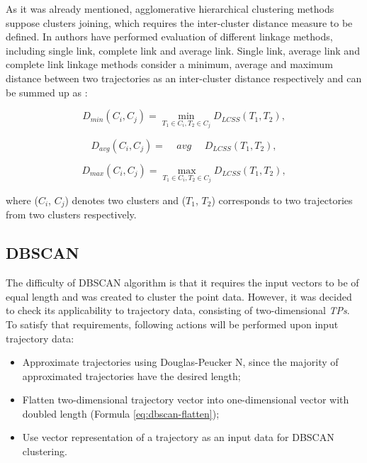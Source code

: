 As it was already mentioned, agglomerative hierarchical clustering methods suppose clusters joining, which requires the inter-cluster distance measure to be defined. In \cite{inproceedings:7_related_work} authors have performed evaluation of different linkage methods, including single link, complete link and average link. Single link, average link and complete link linkage methods consider a minimum, average and maximum distance between two trajectories as an inter-cluster distance respectively and can be summed up as \cite{inproceedings:7_related_work}:

\begin{equation} \label{eq:single_link}
	D_{min}(C_i, C_j) = \min_{T_1 \in C_i, T_2 \in C_j} D_{LCSS}(T_1, T_2),
\end{equation} 

\begin{equation} \label{eq:average_link}
	D_{avg}(C_i, C_j) = \ \ \ \ \ avg\ \ \ \ \ \ D_{LCSS}(T_1, T_2),
\end{equation} 

\begin{equation} \label{eq:complete_link}
	D_{max}(C_i, C_j) = \max_{T_1 \in C_i, T_2 \in C_j} D_{LCSS}(T_1, T_2),
\end{equation} 

where ($C_i$, $C_j$) denotes two clusters and ($T_1$, $T_2$) corresponds to two trajectories from two clusters respectively.

\subsection{DBSCAN}

The difficulty of DBSCAN algorithm is that it requires the input vectors to be of equal length and was created to cluster the point data. However, it was decided to check its applicability to trajectory data, consisting of two-dimensional \textit{TPs}. To satisfy that requirements, following actions will be performed upon input trajectory data:

\begin{itemize}
	\setlength\itemsep{0em}
	\item Approximate trajectories using Douglas-Peucker N, since the majority of approximated trajectories have the desired length;
	\item Flatten two-dimensional trajectory vector into one-dimensional vector with doubled length (Formula \ref{eq:dbscan-flatten});
	\item Use vector representation of a trajectory as an input data for DBSCAN clustering.
\end{itemize}

